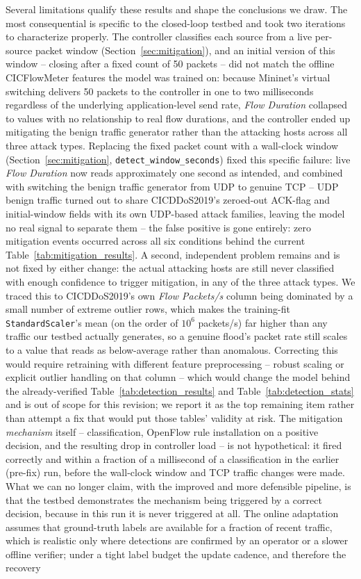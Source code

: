 \documentclass[ASNA,twocolumn]{USG} %
\begin{document}
Several limitations qualify these results and shape the conclusions we draw. The most consequential is specific to the closed-loop testbed and took two iterations to characterize properly. The controller classifies each source from a live per-source packet window (Section~\ref{sec:mitigation}), and an initial version of this window -- closing after a fixed count of 50 packets -- did not match the offline CICFlowMeter features the model was trained on: because Mininet's virtual switching delivers 50 packets to the controller in one to two milliseconds regardless of the underlying application-level send rate, \emph{Flow Duration} collapsed to values with no relationship to real flow durations, and the controller ended up mitigating the benign traffic generator rather than the attacking hosts across all three attack types. Replacing the fixed packet count with a wall-clock window (Section~\ref{sec:mitigation}, \texttt{detect\_window\_seconds}) fixed this specific failure: live \emph{Flow Duration} now reads approximately one second as intended, and combined with switching the benign traffic generator from UDP to genuine TCP -- UDP benign traffic turned out to share CICDDoS2019's zeroed-out ACK-flag and initial-window fields with its own UDP-based attack families, leaving the model no real signal to separate them -- the false positive is gone entirely: zero mitigation events occurred across all six conditions behind the current Table~\ref{tab:mitigation_results}. A second, independent problem remains and is not fixed by either change: the actual attacking hosts are still never classified with enough confidence to trigger mitigation, in any of the three attack types. We traced this to CICDDoS2019's own \emph{Flow Packets/s} column being dominated by a small number of extreme outlier rows, which makes the training-fit \texttt{StandardScaler}'s mean (on the order of $10^6$ packets/s) far higher than any traffic our testbed actually generates, so a genuine flood's packet rate still scales to a value that reads as below-average rather than anomalous. Correcting this would require retraining with different feature preprocessing -- robust scaling or explicit outlier handling on that column -- which would change the model behind the already-verified Table~\ref{tab:detection_results} and Table~\ref{tab:detection_stats} and is out of scope for this revision; we report it as the top remaining item rather than attempt a fix that would put those tables' validity at risk. The mitigation \emph{mechanism} itself -- classification, OpenFlow rule installation on a positive decision, and the resulting drop in controller load -- is not hypothetical: it fired correctly and within a fraction of a millisecond of a classification in the earlier (pre-fix) run, before the wall-clock window and TCP traffic changes were made. What we can no longer claim, with the improved and more defensible pipeline, is that the testbed demonstrates the mechanism being triggered by a correct decision, because in this run it is never triggered at all. The online adaptation assumes that ground-truth labels are available for a fraction of recent traffic, which is realistic only where detections are confirmed by an operator or a slower offline verifier; under a tight label budget the update cadence, and therefore the recovery 
\end{document}
